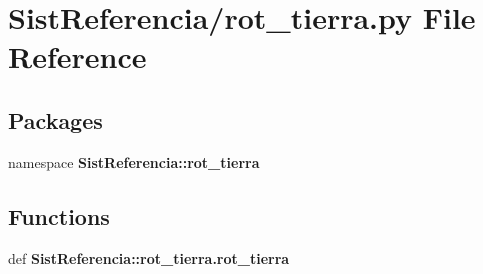 \section{\-Sist\-Referencia/rot\-\_\-tierra.py \-File \-Reference}
\label{rot__tierra_8py}
\subsection*{\-Packages}
\begin{DoxyCompactItemize}
\item 
namespace {\bf \-Sist\-Referencia\-::rot\-\_\-tierra}
\end{DoxyCompactItemize}
\subsection*{\-Functions}
\begin{DoxyCompactItemize}
\item 
def {\bf \-Sist\-Referencia\-::rot\-\_\-tierra.\-rot\-\_\-tierra}
\end{DoxyCompactItemize}
